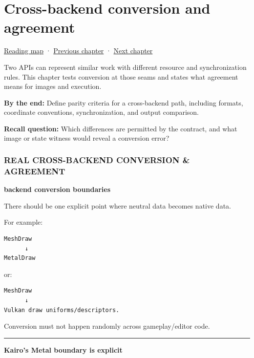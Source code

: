 \hypertarget{06-engine-ii-ch044}{}
\chapter{Cross-backend conversion and agreement}\label{stagechapter:06-engine-ii-ch044}\label{06-engine-ii-ch044-cross-backend-conversion-and-agreement}

\hyperref[volume-reading-map]{Reading map} · \hyperref[06-engine-ii-ch043-compiling-renderer-intent-into-backend-work]{Previous chapter} · \hyperref[06-engine-ii-ch045-rasterizing-kernels-and-connecting-world-identity]{Next chapter}

Two APIs can represent similar work with different resource and synchronization rules. This chapter tests conversion at those seams and states what agreement means for images and execution.

\textbf{By the end:} Define parity criteria for a cross-backend path, including formats, coordinate conventions, synchronization, and output comparison.

\textbf{Recall question:} Which differences are permitted by the contract, and what image or state witness would reveal a conversion error?

\subsection{REAL CROSS-BACKEND CONVERSION \& AGREEMENT}\label{06-engine-ii-ch044-real-cross-backend-conversion-agreement}

\textbf{backend conversion boundaries}

There should be one explicit point where neutral data becomes native data.

For example:

\begin{verbatim}
MeshDraw
      ↓
MetalDraw
\end{verbatim}

or:

\begin{verbatim}
MeshDraw
      ↓
Vulkan draw uniforms/descriptors.
\end{verbatim}

Conversion must not happen randomly across gameplay/editor code.

\begin{center}\rule{0.5\linewidth}{0.5pt}\end{center}

\textbf{Kairo's Metal boundary is explicit}

